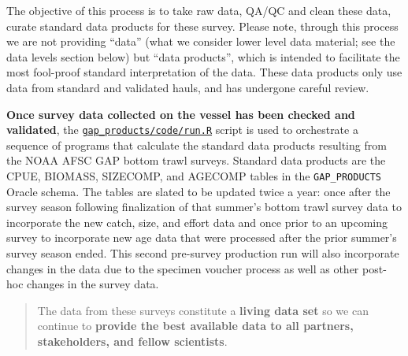 \documentclass[
  letterpaper,
  oneside,
  open=any]{scrbook}
\begin{document}
The objective of this process is to take raw data, QA/QC and clean these
data, curate standard data products for these survey. Please note,
through this process we are not providing ``data'' (what we consider
lower level data material; see the data levels section below) but ``data
products'', which is intended to facilitate the most fool-proof standard
interpretation of the data. These data products only use data from
standard and validated hauls, and has undergone careful review.

\textbf{Once survey data collected on the vessel has been checked and
validated}, the
\href{https://github.com/afsc-gap-products/gap_products/blob/main/code/run.R}{\texttt{gap\_products/code/run.R}}
script is used to orchestrate a sequence of programs that calculate the
standard data products resulting from the NOAA AFSC GAP bottom trawl
surveys. Standard data products are the CPUE, BIOMASS, SIZECOMP, and
AGECOMP tables in the \texttt{GAP\_PRODUCTS} Oracle schema. The tables
are slated to be updated twice a year: once after the survey season
following finalization of that summer's bottom trawl survey data to
incorporate the new catch, size, and effort data and once prior to an
upcoming survey to incorporate new age data that were processed after
the prior summer's survey season ended. This second pre-survey
production run will also incorporate changes in the data due to the
specimen voucher process as well as other post-hoc changes in the survey
data.

\begin{quote}
The data from these surveys constitute a \textbf{living data set} so we
can continue to \textbf{provide the best available data to all partners,
stakeholders, and fellow scientists}.
\end{quote}
\end{document}
